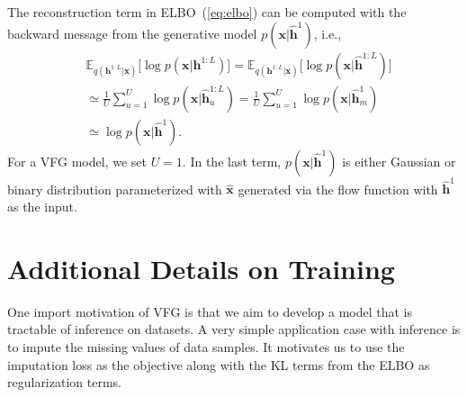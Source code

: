 \documentclass[sigconf, anonymous, review]{acmart}
\theoremstyle{plain}
\theoremstyle{definition}
\theoremstyle{remark}
\begin{document}
The reconstruction term in ELBO~(\ref{eq:elbo}) can be computed with the backward message from the generative model $p(\mathbf{x}| \widehat{\mathbf{h}}^{1})$, i.e.,
\begin{align*} 
&\mathbb{E}_{q(\mathbf{h}^{1:L}|\mathbf{x})}\big[ \log p(\mathbf{x}|\mathbf{h}^{1:L})\big]
=\mathbb{E}_{q(\mathbf{h}^{1:L}|\mathbf{x})}\big[ \log p(\mathbf{x}|\widehat{\mathbf{h}}^{1:L})  \big] \\
&\simeq \frac{1}{U}\sum_{u=1}^U \log p(\mathbf{x}| \widehat{\mathbf{h}}^{1:L}_u) = \frac{1}{U}\sum_{u=1}^U \log p(\mathbf{x}| \widehat{\mathbf{h}}^{1}_m) \\
&\simeq  \log p(\mathbf{x}| \widehat{\mathbf{h}}^{1}) .
 \end{align*}
For a VFG model, we set $U=1$. In the last term,  $p(\mathbf{x}| \widehat{\mathbf{h}}^{1})$ is either Gaussian or binary distribution parameterized with $\widehat{\mathbf{x}}$ generated via the flow function with $\widehat{\mathbf{h}}^{1}$ as the input. 




\section{Additional Details on Training}\label{sec:app_train}


One import motivation of VFG is that we aim to develop a model that is tractable of inference on datasets. 
A very simple application case with inference is to impute the missing values of data samples.  
It motivates us to use the imputation loss as the objective along with the KL terms from the ELBO as regularization terms. 
\end{document}
